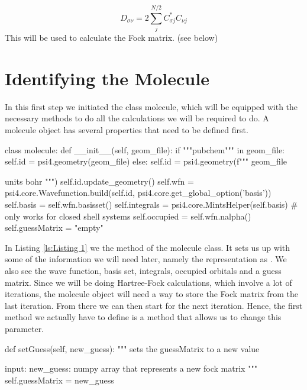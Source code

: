 \begin{equation}\label{eq:densitymatrix}
    D_{\sigma\nu} = 2\sum^{N/2}_jC_{\sigma j}^*C_{\nu j}
\end{equation}
This will be used to calculate the Fock matrix. (see below)
\section{Identifying the Molecule}
\label{sec:step1}
In this first step we initiated the class molecule, which will be equipped with 
the necessary methods to do all the calculations we will be required to do. 
A molecule object has several properties that need to be defined first. 


\begin{python}[caption={intitialising the molecule object},label={ls:Listing 1}]
    class molecule:
        def __init__(self, geom_file):
            if """pubchem""" in geom_file:
                self.id = psi4.geometry(geom_file)
            else:
                self.id = psi4.geometry(f"""
                {geom_file}
            
                units bohr
                """)
            self.id.update_geometry()
            self.wfn =  psi4.core.Wavefunction.build(self.id, 
                            psi4.core.get_global_option('basis'))
            self.basis = self.wfn.basisset()
            self.integrals = psi4.core.MintsHelper(self.basis)
            # only works for closed shell systems
            self.occupied = self.wfn.nalpha()  
            self.guessMatrix = "empty"
    
\end{python}
  

In Listing \ref{ls:Listing 1} we the  method of the 
molecule class. It sets us up with some of the information we will need later, 
namely the  representation as 
. We also see the wave function, basis set, 
integrals, occupied orbitals and a guess matrix. 
Since we will be doing Hartree-Fock calculations, which involve a 
lot of iterations, the molecule object will need a way to store the Fock 
matrix from the last iteration. From there we can then start for the next 
iteration. Hence, the first method we actually have to define is a method that 
allows us to change this parameter.


\begin{python}[caption={setting the guessMatrix},label={ls:Listing 2}]
    def setGuess(self, new_guess):
        """
        sets the guessMatrix to a new value

        input:
        new_guess: numpy array that represents a new fock matrix
        """
        self.guessMatrix = new_guess
\end{python}


